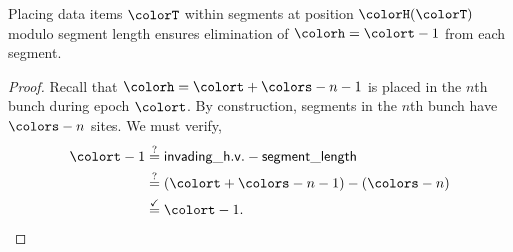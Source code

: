 \begin{lemma}[Placements overwrite \hv{} $\colorh = \colort - 1$]
Placing data items $\colorT$ within segments at position $\colorH(\colorT)$ modulo segment length ensures elimination of \hv{} $\colorh = \colort - 1$ from each segment.
\end{lemma} \label{thm:steady-hv-elimination}
\begin{proof}
Recall that \hv{} $\colorh = \colort + \colors - n - 1$ is placed in the $n$th bunch during epoch $\colort$.
By construction, segments in the $n$th bunch have $\colors - n$ sites.
We must verify,
\begin{align*}
\colort - 1
&\stackrel{?}{=}
\mathsf{invading\_h.v.} - \mathsf{segment\_length}\\
&\stackrel{?}{=}
(\colort + \colors - n - 1) - (\colors - n)
 \\
&\stackrel{\checkmark}{=} \colort - 1.
\end{align*}
\end{proof}

